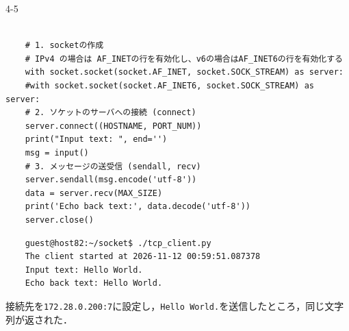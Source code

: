 \begin{maintask}{4-5}
\begin{listing}[H]
\begin{verbatim}
                                                                                                                  
    # 1. socketの作成
    # IPv4 の場合は AF_INETの行を有効化し、v6の場合はAF_INET6の行を有効化する
    with socket.socket(socket.AF_INET, socket.SOCK_STREAM) as server:
    #with socket.socket(socket.AF_INET6, socket.SOCK_STREAM) as server:
    # 2. ソケットのサーバへの接続 (connect)
    server.connect((HOSTNAME, PORT_NUM))                                                                      
    print("Input text: ", end='')
    msg = input()
    # 3. メッセージの送受信 (sendall, recv)
    server.sendall(msg.encode('utf-8'))
    data = server.recv(MAX_SIZE)                                                                              
    print('Echo back text:', data.decode('utf-8'))
    server.close()          
    \end{verbatim}
  \end{listing}
  \begin{termout}[H]
    \caption{echoサーバとの通信結果}\label{out:tcp_echo_client}
    \begin{verbatim}
    guest@host82:~/socket$ ./tcp_client.py
    The client started at 2026-11-12 00:59:51.087378
    Input text: Hello World.
    Echo back text: Hello World.
    \end{verbatim}
  \end{termout}

  接続先を\texttt{172.28.0.200:7}に設定し，\texttt{Hello World.}を送信したところ，同じ文字列が返された．
\end{maintask}
